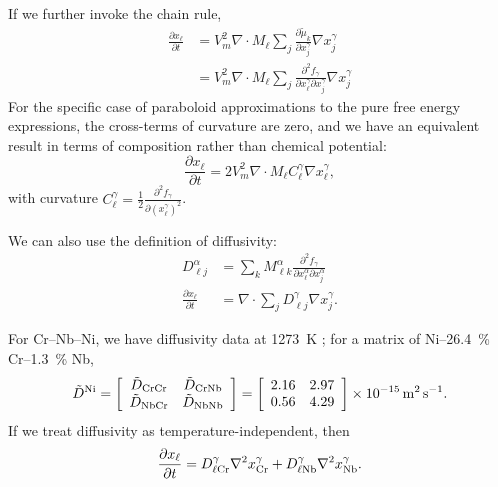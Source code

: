 \documentclass[10pt]{article}
\begin{document}
		If we further invoke the chain rule,
		\begin{align}
			\frac{\partial x_{\ell}}{\partial t} &= V_m^2 \nabla\cdot M_{\ell}\sum_j\frac{\partial \tilde{\mu}_k}{\partial x_j^{\gamma}}\nabla x_j^{\gamma}\\
			                                     &= V_m^2 \nabla\cdot M_{\ell}\sum_j\frac{\partial^2 f_{\gamma}}{\partial x_{\ell}^{\gamma} \partial x_j^{\gamma}}\nabla x_j^{\gamma}
		\end{align}
		For the specific case of paraboloid approximations to the pure free energy expressions, the cross-terms of curvature are zero,
		and we have an equivalent result in terms of composition rather than chemical potential:
		\begin{equation}
			\frac{\partial x_{\ell}}{\partial t} = 2V_m^2 \nabla\cdot M_{\ell}C_{\ell}^{\gamma}\nabla x_{\ell}^{\gamma},\label{eqn:interdiff}
		\end{equation}
		with curvature $C_{\ell}^{\gamma}=\frac{1}{2}\frac{\partial^2 f_{\gamma}}{\partial \left({x_{\ell}^{\gamma}}\right)^2}$.
		
		We can also use the definition of diffusivity:
		\begin{align}
			D_{\ell j}^{\alpha} &= \sum_k M_{\ell k}^{\alpha}\frac{\partial^2 f_{\gamma}}{\partial x_{\ell}^{\alpha} \partial x_j^{\alpha}}\\
			\frac{\partial x_{\ell}}{\partial t} &= \nabla\cdot\sum_j D_{\ell j}^{\gamma} \nabla x_j^{\gamma}.
		\end{align}

		For Cr--Nb--Ni, we have diffusivity data at \SI{1273}{\kelvin} \cite{Xu2016};
		for a matrix of Ni--\SI{26.4}{\percent} Cr--\SI{1.3}{\percent} Nb,
		\begin{equation}\label{eqn:diffusion}
			\tilde{D}^{\ce{Ni}} = \left[\begin{array}{cc}
			                            \tilde{D}_{\mathrm{CrCr}} & \tilde{D}_{\mathrm{CrNb}}\\
			                            \tilde{D}_{\mathrm{NbCr}} & \tilde{D}_{\mathrm{NbNb}}
		                                \end{array}
		                          \right]
			                    = \left[\begin{array}{cc}
			                            2.16 & 2.97\\
			                            0.56 & 4.29
		                                \end{array}
		                          \right] \times \SI{e-15}{\meter\squared\per\second}.
		\end{equation}
		If we treat diffusivity as temperature-independent, then
		\begin{equation}
			\frac{\partial x_{\ell}}{\partial t} = D_{\ell\ce{Cr}}^{\gamma}\nabla^2 x_{\ce{Cr}}^{\gamma} + D_{\ell\ce{Nb}}^{\gamma}\nabla^2 x_{\ce{Nb}}^{\gamma}.
		\end{equation}
		
\end{document}
